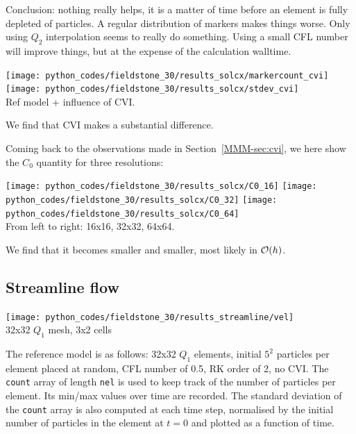 Conclusion: nothing really helps, it is a matter of time before an element is fully depleted of particles. 
A regular distribution of markers makes things worse. Only using $Q_2$ interpolation seems to really do 
something. Using a small CFL number will improve things, but at the expense of the calculation walltime. 


\begin{center}
\texttt{[image: python\_codes/fieldstone\_30/results\_solcx/markercount\_cvi]}
\texttt{[image: python\_codes/fieldstone\_30/results\_solcx/stdev\_cvi]}\\
{\captionfont Ref model + influence of CVI.} 
\end{center}

We find that CVI makes a substantial difference. 


Coming back to the observations made in Section~\ref{MMM-sec:cvi}, 
we here show the $C_0$ quantity for three resolutions:

\begin{center}
\texttt{[image: python\_codes/fieldstone\_30/results\_solcx/C0\_16]}
\texttt{[image: python\_codes/fieldstone\_30/results\_solcx/C0\_32]}
\texttt{[image: python\_codes/fieldstone\_30/results\_solcx/C0\_64]}\\
{\captionfont From left to right: 16x16, 32x32, 64x64.} 
\end{center}
We find that it becomes smaller and smaller, most likely in ${\cal O}(h)$.


\newpage
\subsection*{Streamline flow}


\begin{center}
\texttt{[image: python\_codes/fieldstone\_30/results\_streamline/vel]}\\
{\captionfont 32x32 $Q_1$ mesh, 3x2 cells}
\end{center}

The reference model is as follows: 32x32 $Q_1$ elements, initial $5^2$ particles per element placed at random, 
CFL number of 0.5, RK order of 2, no CVI.
The {\tt count} array of length {\tt nel} is used to keep track of the number of particles per element. 
Its min/max values over time are recorded. The standard deviation of the {\tt count} array is also 
computed at each time step, normalised by the 
initial number of particles in the element at $t=0$ and plotted as a function of time. 

